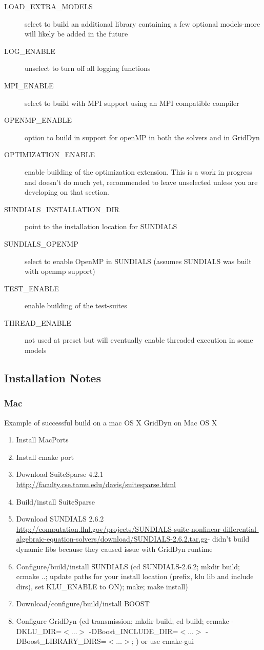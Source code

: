 \documentclass[12pt]{article} %
\begin{document}
\begin{description}
\item [LOAD\_EXTRA\_MODELS] select to build an additional library containing a few optional models-more will likely be added in the future
\item [LOG\_ENABLE]  unselect to turn off all logging functions
\item [MPI\_ENABLE] select to build with MPI support using an MPI compatible compiler
\item [OPENMP\_ENABLE] option to build in support for openMP in both the solvers and in GridDyn
\item [OPTIMIZATION\_ENABLE]  enable building of the optimization extension.  This is a work in progress and doesn't do much yet,  recommended to leave unselected unless you are developing on that section.
\item [SUNDIALS\_INSTALLATION\_DIR] point to the installation location for SUNDIALS
\item [SUNDIALS\_OPENMP]  select to enable OpenMP in SUNDIALS (assumes SUNDIALS was built with openmp support)
\item [TEST\_ENABLE]  enable building of the test-suites
\item [THREAD\_ENABLE]   not used at preset but will eventually enable threaded execution in some models
\end{description}

\subsection{Installation Notes}
\subsubsection{Mac}
Example of successful build on a mac OS X
GridDyn on Mac OS X

\begin{enumerate}
\item Install MacPorts
\item Install cmake port
\item Download SuiteSparse 4.2.1 \url{http://faculty.cse.tamu.edu/davis/suitesparse.html}
\item Build/install SuiteSparse
\item Download SUNDIALS 2.6.2 \url{http://computation.llnl.gov/projects/SUNDIALS-suite-nonlinear-differential-algebraic-equation-solvers/download/SUNDIALS-2.6.2.tar.gz}- didn't build dynamic libs because they caused issue with GridDyn runtime
\item Configure/build/install SUNDIALS (cd SUNDIALS-2.6.2; mkdir build; ccmake ..; update paths for your install location (prefix, klu lib and include dirs), set KLU\_ENABLE to ON); make; make install)
\item Download/configure/build/install BOOST 
\item Configure GridDyn (cd transmission; mkdir build; cd build; ccmake -DKLU\_DIR=$<\hdots>$ -DBoost\_INCLUDE\_DIR=$<\hdots>$ -DBoost\_LIBRARY\_DIRS=$<\hdots>$; ) or use cmake-gui
\end{enumerate}
\end{document}
